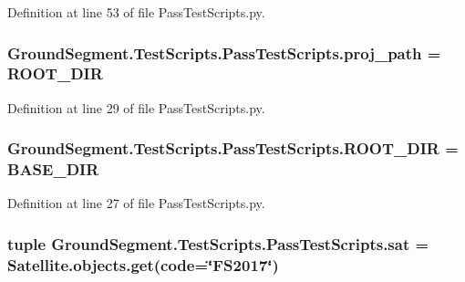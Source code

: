 Definition at line 53 of file Pass\+Test\+Scripts.\+py.

\hypertarget{namespace_ground_segment_1_1_test_scripts_1_1_pass_test_scripts_a96310377ba936a3a18993411f9dfce11}{}
\subsubsection[{proj\+\_\+path}]{\setlength{\rightskip}{0pt plus 5cm}Ground\+Segment.\+Test\+Scripts.\+Pass\+Test\+Scripts.\+proj\+\_\+path = {\bf R\+O\+O\+T\+\_\+\+D\+I\+R}}\label{namespace_ground_segment_1_1_test_scripts_1_1_pass_test_scripts_a96310377ba936a3a18993411f9dfce11}


Definition at line 29 of file Pass\+Test\+Scripts.\+py.

\hypertarget{namespace_ground_segment_1_1_test_scripts_1_1_pass_test_scripts_afa1dc4259563d460cb6edc96879ca90f}{}
\subsubsection[{R\+O\+O\+T\+\_\+\+D\+I\+R}]{\setlength{\rightskip}{0pt plus 5cm}Ground\+Segment.\+Test\+Scripts.\+Pass\+Test\+Scripts.\+R\+O\+O\+T\+\_\+\+D\+I\+R = B\+A\+S\+E\+\_\+\+D\+I\+R}\label{namespace_ground_segment_1_1_test_scripts_1_1_pass_test_scripts_afa1dc4259563d460cb6edc96879ca90f}


Definition at line 27 of file Pass\+Test\+Scripts.\+py.

\hypertarget{namespace_ground_segment_1_1_test_scripts_1_1_pass_test_scripts_a13e60626bb4ad7f095912a6f4714beb9}{}
\subsubsection[{sat}]{\setlength{\rightskip}{0pt plus 5cm}tuple Ground\+Segment.\+Test\+Scripts.\+Pass\+Test\+Scripts.\+sat = Satellite.\+objects.\+get(code=\char`\"{}F\+S2017\char`\"{})}\label{namespace_ground_segment_1_1_test_scripts_1_1_pass_test_scripts_a13e60626bb4ad7f095912a6f4714beb9}


